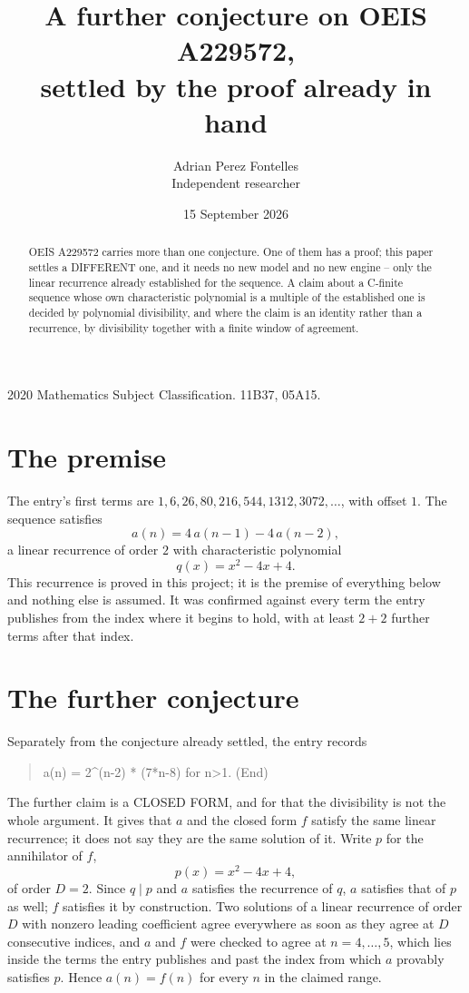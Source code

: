 \documentclass[11pt,a4paper]{article}
\title{A further conjecture on OEIS A229572,\\ \large settled by the proof already in hand}
\author{Adrian Perez Fontelles\\ \small Independent researcher}
\date{15 September 2026}
\theoremstyle{plain}
\theoremstyle{definition}
\begin{document}
\maketitle

\begin{abstract}
OEIS A229572 carries more than one conjecture. One of them has a proof; this paper settles a
DIFFERENT one, and it needs no new model and no new engine -- only the linear recurrence already
established for the sequence. A claim about a C-finite sequence whose own characteristic
polynomial is a multiple of the established one is decided by polynomial divisibility, and where
the claim is an identity rather than a recurrence, by divisibility together with a finite window
of agreement.
\end{abstract}

\noindent\small 2020 Mathematics Subject Classification. 11B37, 05A15.\normalsize

\section{The premise}

The entry's first terms are $1, 6, 26, 80, 216, 544, 1312, 3072,\dots$, with offset $1$. The sequence satisfies
\[
  a(n)=4\,a(n-1) - 4\,a(n-2) ,
\]
a linear recurrence of order $2$ with characteristic polynomial
\[
  q(x)=x^{2} - 4 x + 4 .
\]
This recurrence is proved in this project; it is the premise of everything below and nothing else is assumed.
It was confirmed against every term the entry publishes from the index where it begins to hold,
with at least $2+2$ further terms after that index.

\section{The further conjecture}

Separately from the conjecture already settled, the entry records

\begin{quote}\raggedright a(n) = 2\^{}(n-2) * (7*n-8) for n>1. (End)\end{quote}

The further claim is a CLOSED FORM, and for that the divisibility is not the whole argument. It
gives that $a$ and the closed form $f$ satisfy the same linear recurrence; it does not say they
are the same solution of it. Write $p$ for the annihilator of $f$,
\[
  p(x)=x^{2} - 4 x + 4 ,
\]
of order $D=2$. Since $q\mid p$ and $a$ satisfies the recurrence of $q$, $a$ satisfies that of
$p$ as well; $f$ satisfies it by construction. Two solutions of a linear recurrence of order $D$
with nonzero leading coefficient agree everywhere as soon as they agree at $D$ consecutive
indices, and $a$ and $f$ were checked to agree at $n=4,\dots,5$,
which lies inside the terms the entry publishes and past the index from which $a$ provably
satisfies $p$. Hence $a(n)=f(n)$ for every $n$ in the claimed range.
\end{document}
